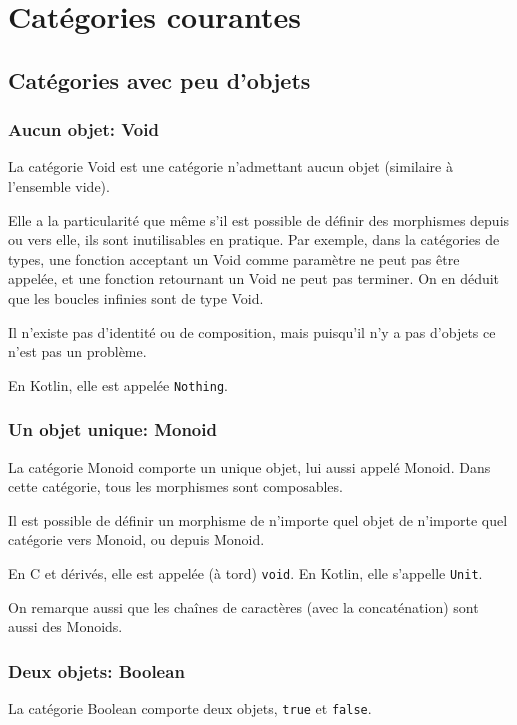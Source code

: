 \documentclass[a4paper,10pt,french,openany]{memoir}
\begin{document}
\chapter{Catégories courantes}

\section{Catégories avec peu d'objets}

\subsection{Aucun objet: Void}
La catégorie Void est une catégorie n'admettant aucun objet (similaire à l'ensemble vide).

Elle a la particularité que même s'il est possible de définir des morphismes depuis ou vers elle, ils sont inutilisables en pratique. Par exemple, dans la catégories de types, une fonction acceptant un Void comme paramètre ne peut pas être appelée, et une fonction retournant un Void ne peut pas terminer. On en déduit que les boucles infinies sont de type Void.

Il n'existe pas d'identité ou de composition, mais puisqu'il n'y a pas d'objets ce n'est pas un problème.

En Kotlin, elle est appelée \lstinline{Nothing}.

\subsection{Un objet unique: Monoid}
La catégorie Monoid comporte un unique objet, lui aussi appelé Monoid.
Dans cette catégorie, tous les morphismes sont composables.

Il est possible de définir un morphisme de n'importe quel objet de n'importe quel catégorie vers Monoid, ou depuis Monoid.

En C et dérivés, elle est appelée (à tord) \lstinline{void}.
En Kotlin, elle s'appelle \lstinline{Unit}.

On remarque aussi que les chaînes de caractères (avec la concaténation) sont aussi des Monoids.

\subsection{Deux objets: Boolean}
La catégorie Boolean comporte deux objets, \lstinline{true} et \lstinline{false}.
\end{document}
